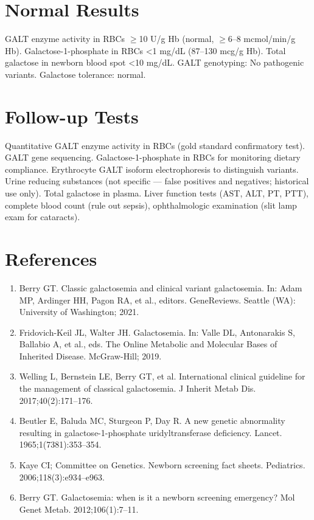 \section*{Normal Results}
GALT enzyme activity in RBCs $\geq$10 U/g Hb (normal, $\geq$6--8 mcmol/min/g Hb). Galactose-1-phosphate in RBCs <1 mg/dL (87--130 mcg/g Hb). Total galactose in newborn blood spot <10 mg/dL. GALT genotyping: No pathogenic variants. Galactose tolerance: normal.

\section*{Follow-up Tests}
Quantitative GALT enzyme activity in RBCs (gold standard confirmatory test). GALT gene sequencing. Galactose-1-phosphate in RBCs for monitoring dietary compliance. Erythrocyte GALT isoform electrophoresis to distinguish variants. Urine reducing substances (not specific --- false positives and negatives; historical use only). Total galactose in plasma. Liver function tests (AST, ALT, PT, PTT), complete blood count (rule out sepsis), ophthalmologic examination (slit lamp exam for cataracts).

\section*{References}
\begin{enumerate}
  \item Berry GT. Classic galactosemia and clinical variant galactosemia. In: Adam MP, Ardinger HH, Pagon RA, et al., editors. GeneReviews. Seattle (WA): University of Washington; 2021.
  \item Fridovich-Keil JL, Walter JH. Galactosemia. In: Valle DL, Antonarakis S, Ballabio A, et al., eds. The Online Metabolic and Molecular Bases of Inherited Disease. McGraw-Hill; 2019.
  \item Welling L, Bernstein LE, Berry GT, et al. International clinical guideline for the management of classical galactosemia. J Inherit Metab Dis. 2017;40(2):171--176.
  \item Beutler E, Baluda MC, Sturgeon P, Day R. A new genetic abnormality resulting in galactose-1-phosphate uridyltransferase deficiency. Lancet. 1965;1(7381):353--354.
  \item Kaye CI; Committee on Genetics. Newborn screening fact sheets. Pediatrics. 2006;118(3):e934--e963.
  \item Berry GT. Galactosemia: when is it a newborn screening emergency? Mol Genet Metab. 2012;106(1):7--11.
\end{enumerate}

\clearpage
